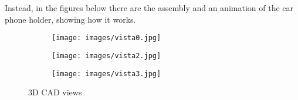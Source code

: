 \documentclass[11pt,a4paper]{article}
\begin{document}
	Instead, in the figures below there are the assembly and an animation of the car phone holder, showing how it works.
	\begin{figure}[H]
		\centering
		\begin{subfigure}[b]{0.3\textwidth}
			\texttt{[image: images/vista0.jpg]}
		\end{subfigure}
		\hfill
		\begin{subfigure}[b]{0.3\textwidth}
			\texttt{[image: images/vista2.jpg]}
		\end{subfigure}
		\hfill
		\begin{subfigure}[b]{0.3\textwidth}
			\texttt{[image: images/vista3.jpg]}
		\end{subfigure}
		\caption{3D CAD views}
		\label{3D CAD}
	\end{figure}
	
	\begin{center}
		 \\
	\end{center}

\footnotesize
\newpage
\thispagestyle{empty}
\listoffigures
\listoftables
\end{document}
